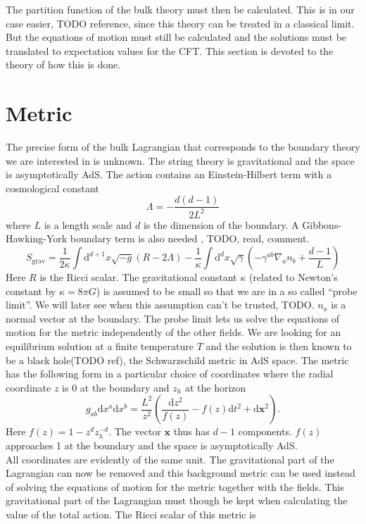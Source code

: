 \documentclass[12pt]{report}
\renewcommand{\d}{\ensuremath{\mathrm{d}}}
\begin{document}
The partition function of the bulk theory must then be calculated. This is in our case easier, TODO reference, since this theory can be treated in a classical limit. But the equations of motion must still be calculated and the solutions must be translated to expectation values for the CFT. This section is devoted to the theory of how this is done.
\section{Metric}
The precise form of the bulk Lagrangian that corresponds to the boundary theory we are interested in is unknown. The string theory is gravitational and the space is asymptotically AdS. The action contains an Einstein-Hilbert term with a cosmological constant
\begin{equation}
\Lambda=-\frac{d(d-1)}{2L^2}
\end{equation}
where $L$ is a length scale and $d$ is the dimension of the boundary.
A Gibbons-Hawking-York boundary term is also needed \cite{PhysRevD.15.2752}, \cite{PhysRevLett.28.1082} TODO, read, comment.
\begin{equation}
 S_{\mathrm{grav}}=\frac{1}{2\kappa}\int \d^{d+1}x\sqrt{-g}\left(R-2\Lambda\right)-\frac{1}{\kappa}\int \d^dx\sqrt{\gamma}\left(-\gamma^{ab}\nabla_an_b+\frac{d-1}{L}\right)
\end{equation}
Here $R$ is the Ricci scalar. The gravitational constant $\kappa$ (related to Newton's constant by $\kappa=8\pi G$) is assumed to be small so that we are in a so called ``probe limit''. We will later see when this assumption can't be trusted, TODO. $n_a$ is a normal vector at the boundary. The probe limit lets us solve the equations of motion for the metric independently of the other fields. We are looking for an equilibrium solution at a finite temperature $T$ and the solution is then known to be a black hole(TODO ref), the Schwarzschild metric in AdS space. The metric has the following form in a particular choice of coordinates where the radial coordinate $z$ is 0 at the boundary and $z_h$ at the horizon
\begin{equation}
 g_{ab}\d x^a\d x^b=\frac{L^2}{z^2}\left(\frac{\d z^2}{f(z)}-f(z)\d t^2+\d \mathbf{x}^2\right).\label{metric}
\end{equation}
Here $f(z)=1-z^dz_h^{-d}$. The vector $\mathbf{x}$ thus has $d-1$ components. $f(z)$ approaches 1 at the boundary and the space is asymptotically AdS.\\
All coordinates are evidently of the same unit. The gravitational part of the Lagrangian can now be removed and this background metric can be used instead of solving the equations of motion for the metric together with the fields. This gravitational part of the Lagrangian must though be kept when calculating the value of the total action. The Ricci scalar of this metric is
\end{document}

